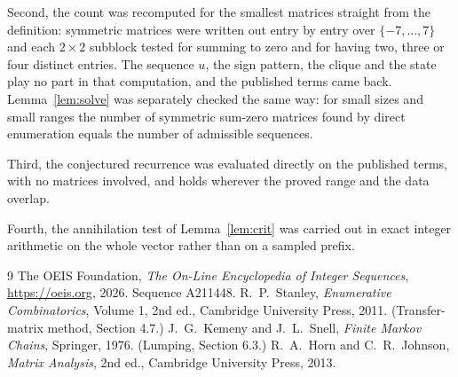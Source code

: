 \documentclass[11pt,a4paper]{article}
\theoremstyle{plain}
\theoremstyle{definition}
\begin{document}
Second, the count was recomputed for the smallest matrices straight from the definition:
symmetric matrices were written out entry by entry over $\{-7,\dots,7\}$ and each
$2\times2$ subblock tested for summing to zero and for having two, three or four distinct entries. The
sequence $u$, the sign pattern, the clique and the state play no part in that computation, and
the published terms came back. Lemma~\ref{lem:solve} was separately checked the same way: for
small sizes and small ranges the number of symmetric sum-zero matrices found by direct
enumeration equals the number of admissible sequences.

Third, the conjectured recurrence was evaluated directly on the published terms, with no
matrices involved, and holds wherever the proved range and the data overlap.

Fourth, the annihilation test of Lemma~\ref{lem:crit} was carried out in exact integer
arithmetic on the whole vector rather than on a sampled prefix.

\begin{thebibliography}{9}
 The OEIS Foundation, \emph{The On-Line Encyclopedia of Integer
Sequences}, \url{https://oeis.org}, 2026. Sequence A211448.
 R.~P.~Stanley, \emph{Enumerative Combinatorics}, Volume 1, 2nd ed.,
Cambridge University Press, 2011. (Transfer-matrix method, Section 4.7.)
 J.~G.~Kemeny and J.~L.~Snell, \emph{Finite Markov Chains}, Springer, 1976.
(Lumping, Section 6.3.)
 R.~A.~Horn and C.~R.~Johnson, \emph{Matrix Analysis}, 2nd ed., Cambridge
University Press, 2013.
\end{thebibliography}
\end{document}
